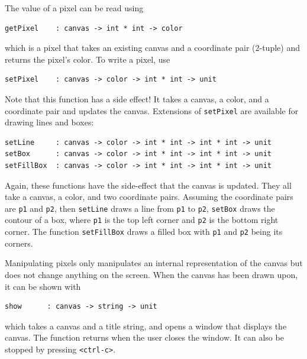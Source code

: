 \documentclass{article}
\begin{document}
The value of a pixel can be read using
\begin{lstlisting}
getPixel    : canvas -> int * int -> color
\end{lstlisting}
which is a pixel that takes an existing canvas and a coordinate pair (2-tuple) and returns the pixel's color.
To write a pixel, use
\begin{lstlisting}
setPixel    : canvas -> color -> int * int -> unit
\end{lstlisting}
Note that this function has a side effect! It takes a canvas, a color, and a coordinate pair and updates the canvas. Extensions of \lstinline{setPixel} are available for drawing lines and boxes:
\begin{lstlisting}
setLine     : canvas -> color -> int * int -> int * int -> unit
setBox      : canvas -> color -> int * int -> int * int -> unit
setFillBox  : canvas -> color -> int * int -> int * int -> unit
\end{lstlisting}
Again, these functions have the side-effect that the canvas is updated. They all take a canvas, a color, and two coordinate pairs. Assuming the coordinate pairs are \lstinline{p1} and \lstinline{p2}, then \lstinline{setLine} draws 
a line from \lstinline{p1} to \lstinline{p2}, \lstinline{setBox} draws the contour of a box, where \lstinline{p1} is the top left corner and \lstinline{p2} is the bottom right corner. The function \lstinline{setFillBox} draws a filled box with \lstinline{p1} and \lstinline{p2} being its corners.

Manipulating pixels only manipulates an internal representation of the canvas but does not change anything on the screen. When the canvas has been drawn upon, it can be shown with
\begin{lstlisting}
show      : canvas -> string -> unit
\end{lstlisting}
which takes a canvas and a title string, and opens a window that displays the canvas. The function returns when the user closes the window. It can also be stopped by pressing \texttt{<ctrl-c>}.
\end{document}
